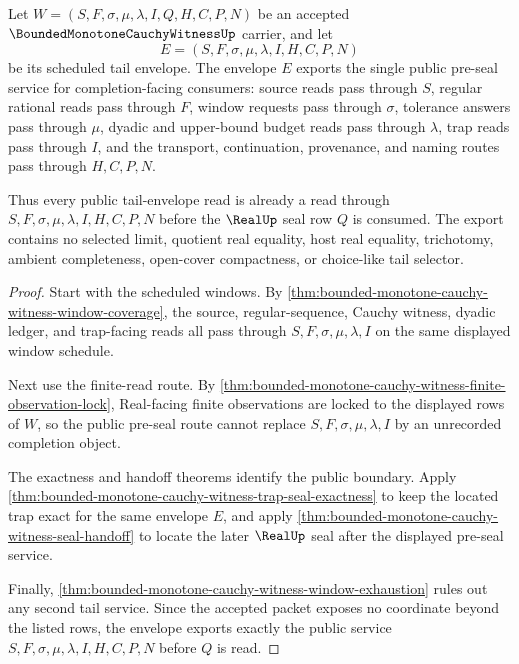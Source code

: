 \begin{theorem}
\label{thm:bounded-monotone-cauchy-witness-tail-envelope-public-export}
Let $W=(S,F,\sigma,\mu,\lambda,I,Q,H,C,P,N)$ be an accepted $\BoundedMonotoneCauchyWitnessUp$ carrier, and let
$$
E=(S,F,\sigma,\mu,\lambda,I,H,C,P,N)
$$
be its scheduled tail envelope. The envelope $E$ exports the single public pre-seal service for completion-facing consumers: source reads pass through $S$, regular rational reads pass through $F$, window requests pass through $\sigma$, tolerance answers pass through $\mu$, dyadic and upper-bound budget reads pass through $\lambda$, trap reads pass through $I$, and the transport, continuation, provenance, and naming routes pass through $H,C,P,N$.

Thus every public tail-envelope read is already a read through $S,F,\sigma,\mu,\lambda,I,H,C,P,N$ before the $\RealUp$ seal row $Q$ is consumed. The export contains no selected limit, quotient real equality, host real equality, trichotomy, ambient completeness, open-cover compactness, or choice-like tail selector.
\end{theorem}
\begin{proof}
Start with the scheduled windows. By \autoref{thm:bounded-monotone-cauchy-witness-window-coverage}, the source, regular-sequence, Cauchy witness, dyadic ledger, and trap-facing reads all pass through $S,F,\sigma,\mu,\lambda,I$ on the same displayed window schedule.

Next use the finite-read route. By \autoref{thm:bounded-monotone-cauchy-witness-finite-observation-lock}, Real-facing finite observations are locked to the displayed rows of $W$, so the public pre-seal route cannot replace $S,F,\sigma,\mu,\lambda,I$ by an unrecorded completion object.

The exactness and handoff theorems identify the public boundary. Apply \autoref{thm:bounded-monotone-cauchy-witness-trap-seal-exactness} to keep the located trap exact for the same envelope $E$, and apply \autoref{thm:bounded-monotone-cauchy-witness-seal-handoff} to locate the later $\RealUp$ seal after the displayed pre-seal service.

Finally, \autoref{thm:bounded-monotone-cauchy-witness-window-exhaustion} rules out any second tail service. Since the accepted packet exposes no coordinate beyond the listed rows, the envelope exports exactly the public service $S,F,\sigma,\mu,\lambda,I,H,C,P,N$ before $Q$ is read.
\end{proof}

